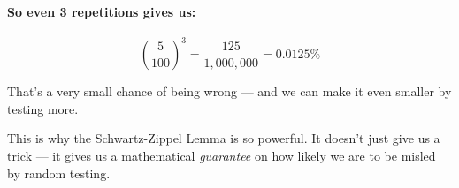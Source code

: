 \paragraph{So even 3 repetitions gives us:}
\[
\left(\frac{5}{100}\right)^3 = \frac{125}{1,000,000} = 0.0125\%
\]

That’s a very small chance of being wrong — and we can make it even smaller by testing more.

\medskip
This is why the Schwartz-Zippel Lemma is so powerful. It doesn’t just give us a trick — it gives us a mathematical \textit{guarantee} on how likely we are to be misled by random testing.

